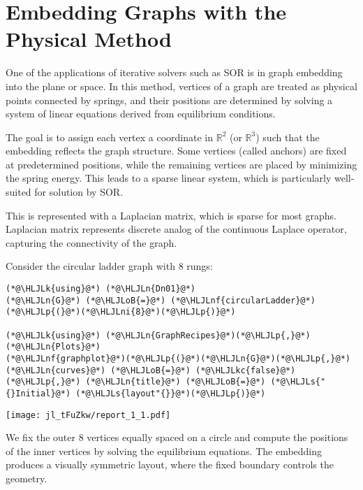 \documentclass[12pt,a4paper]{article}
\newcommand{\HLJLk}[1]{\textcolor[RGB]{148,91,176}{\textbf{#1}}}
\newcommand{\HLJLkc}[1]{\textcolor[RGB]{59,151,46}{\textit{#1}}}
\newcommand{\HLJLn}[1]{#1}
\newcommand{\HLJLnf}[1]{\textcolor[RGB]{66,102,213}{#1}}
\newcommand{\HLJLs}[1]{\textcolor[RGB]{201,61,57}{#1}}
\newcommand{\HLJLni}[1]{\textcolor[RGB]{59,151,46}{#1}}
\newcommand{\HLJLoB}[1]{\textcolor[RGB]{102,102,102}{\textbf{#1}}}
\newcommand{\HLJLp}[1]{#1}
\begin{document}
\section{Embedding Graphs with the Physical Method}
One of the applications of iterative solvers such as SOR is in graph embedding into the plane or space. In this method, vertices of a graph are treated as physical points connected by springs, and their positions are determined by solving a system of linear equations derived from equilibrium conditions. 

The goal is to assign each vertex a coordinate in $\mathbb{R}^2$ (or $\mathbb{R}^3$) such that the embedding reflects the graph structure.   Some vertices (called anchors) are fixed at predetermined positions, while the remaining vertices are placed by minimizing the spring energy.   This leads to a sparse linear system, which is particularly well-suited for solution by SOR.

This is represented with a Laplacian matrix, which is sparse for most graphs. Laplacian matrix represents discrete analog of the continuous Laplace operator, capturing the connectivity of the graph.  

Consider the circular ladder graph with 8 rungs:


\begin{lstlisting}
(*@\HLJLk{using}@*) (*@\HLJLn{Dn01}@*)
(*@\HLJLn{G}@*) (*@\HLJLoB{=}@*) (*@\HLJLnf{circularLadder}@*)(*@\HLJLp{(}@*)(*@\HLJLni{8}@*)(*@\HLJLp{)}@*)

(*@\HLJLk{using}@*) (*@\HLJLn{GraphRecipes}@*)(*@\HLJLp{,}@*) (*@\HLJLn{Plots}@*)
(*@\HLJLnf{graphplot}@*)(*@\HLJLp{(}@*)(*@\HLJLn{G}@*)(*@\HLJLp{,}@*) (*@\HLJLn{curves}@*) (*@\HLJLoB{=}@*) (*@\HLJLkc{false}@*)(*@\HLJLp{,}@*) (*@\HLJLn{title}@*) (*@\HLJLoB{=}@*) (*@\HLJLs{"{}Initial}@*) (*@\HLJLs{layout"{}}@*)(*@\HLJLp{)}@*)
\end{lstlisting}

\texttt{[image: jl\_tFuZkw/report\_1\_1.pdf]}

We fix the outer 8 vertices equally spaced on a circle and compute the positions of the inner vertices by solving the equilibrium equations.   The embedding produces a visually symmetric layout, where the fixed boundary controls the geometry.
\end{document}
